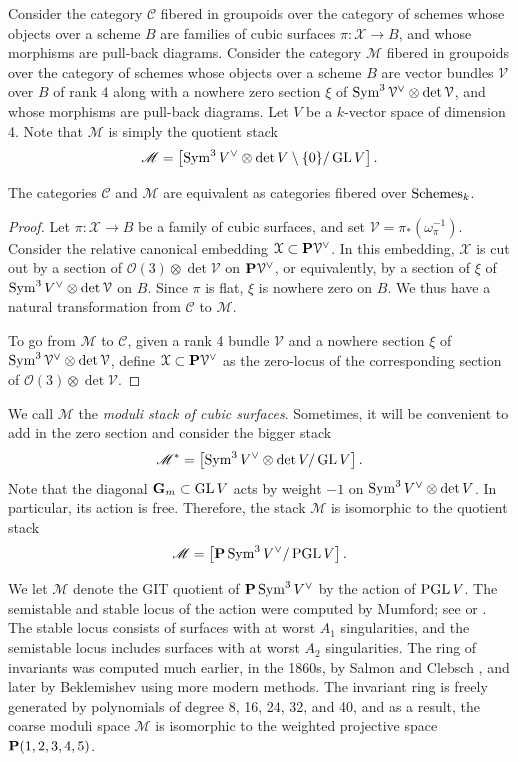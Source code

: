 \documentclass[12pt,reqno]{amsart}
\renewcommand{\k}{k}
\renewcommand{\to}{{\longrightarrow}}
\numberwithin{equation}{section}
\renewcommand{\O}{\mathcal O}
\newcommand{\G}{\mathbf G}
\newcommand{\cX}{\mathcal{X}}
\begin{document}
Consider the category $\mathscr {C}$ fibered in groupoids over the
category of schemes whose objects over a scheme $B$ are families of
cubic surfaces $\pi \colon \cX \to B$, and whose morphisms are pull-back
diagrams.  Consider the category $\mathscr {M}$ fibered in groupoids
over the category of schemes whose objects over a scheme $B$ are
vector bundles $\mathcal V$ over $B$ of rank 4 along with a nowhere
zero section $\xi$ of
$\Sym^3 \mathcal V^\vee \otimes \det \mathcal V$, and whose morphisms
are pull-back diagrams.  Let $V$ be a $\k$-vector space of dimension
4.  Note that $\mathscr{M}$ is simply the quotient stack
\[\mathscr{M} = \left[\Sym^3 V^\vee \otimes \det V \setminus \{0\} / \GL V \right]. \]
\begin{proposition}\label{prop:cubicstack}
  The categories $\mathscr{C}$ and $\mathscr{M}$ are equivalent as categories fibered over ${\rm Schemes}_k$.
\end{proposition}
\begin{proof}
  Let $\pi \colon \cX \to B$ be a family of cubic surfaces, and set
  $\mathcal V = \pi_* \left( \omega_{\pi}^{-1} \right)$.  Consider the
  relative canonical embedding $\cX \subset \P \mathcal V^\vee$.  In
  this embedding, $\cX$ is cut out by a section of
  $\O(3) \otimes \det \mathcal V$ on $\P \mathcal V^\vee$, or
  equivalently, by a section of $\xi$ of
  $\Sym^3V^\vee \otimes \det \mathcal V$ on $B$.  Since $\pi$ is flat,
  $\xi$ is nowhere zero on $B$.  We thus have a natural transformation
  from $\mathscr{C}$ to $\mathscr{M}$.

  To go from $\mathscr{M}$ to $\mathscr{C}$, given a rank 4 bundle $\mathcal V$ and a nowhere section $\xi$ of $\Sym^3 \mathcal V^\vee \otimes \det \mathcal V$, define $\cX \subset \P \mathcal V^\vee$ as the zero-locus of the corresponding section of $\O(3) \otimes \det \mathcal V$.
\end{proof}

We call $\mathscr{M}$ the \emph{moduli stack of cubic surfaces}.
Sometimes, it will be convenient to add in the zero section and consider the bigger stack
\[ \mathscr{M}^* = \left[\Sym^3 V^\vee \otimes \det V / \GL V \right].\]
Note that the diagonal $\G_m \subset \GL V$ acts by weight $-1$ on $\Sym^3 V^\vee \otimes \det V$.
In particular, its action is free.
Therefore, the stack $\mathscr{M}$ is isomorphic to the quotient stack
\[ \mathscr{M} = \left[ \P \Sym^3V^\vee / \PGL V \right].\]

We let $\mathcal M$ denote the GIT quotient of $\P \Sym^3V^\vee$ by
the action of $\PGL V$.  The semistable and stable locus of the
action were computed by Mumford; see \cite[Chapter 4, \S
2]{mum.fog.kir:94} or \cite[1.14]{mum:77}.  The stable locus consists
of surfaces with at worst $A_1$ singularities, and the semistable
locus includes surfaces with at worst $A_2$ singularities.  The ring
of invariants was computed much earlier, in the 1860s, by Salmon
\cite{sal:60} and Clebsch \cite{cle:61,cle:61*1}, and later by
Beklemishev \cite{bek:82} using more modern methods.  The invariant
ring is freely generated by polynomials of degree 8, 16, 24, 32, and
40, and as a result, the coarse moduli space $\mathcal M$ is
isomorphic to the weighted projective space $\P(1,2,3,4,5)$.
\end{document}
